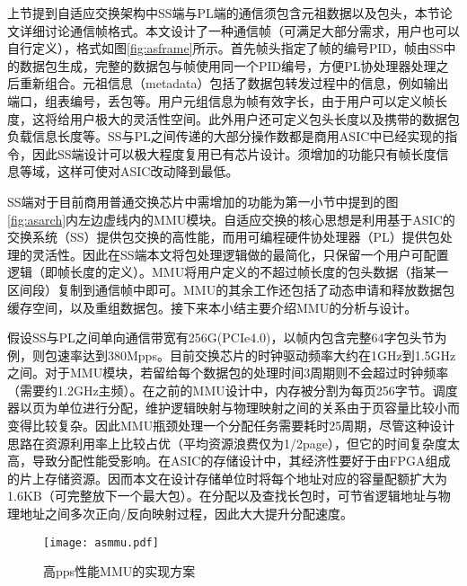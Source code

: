 上节提到自适应交换架构中SS端与PL端的通信须包含元祖数据以及包头，本节论文详细讨论通信帧格式。本文设计了一种通信帧（可满足大部分需求，用户也可以自行定义），格式如图\ref{fig:asframe}所示。首先帧头指定了帧的编号PID，帧由SS中的数据包生成，完整的数据包与帧使用同一个PID编号，方便PL协处理器处理之后重新组合。元祖信息（metadata）包括了数据包转发过程中的信息，例如输出端口，组表编号，丢包等。用户元组信息为帧有效字长，由于用户可以定义帧长度，这将给用户极大的灵活性空间。此外用户还可定义包头长度以及携带的数据包负载信息长度等。SS与PL之间传递的大部分操作数都是商用ASIC中已经实现的指令，因此SS端设计可以极大程度复用已有芯片设计。须增加的功能只有帧长度信息等域，这样可使对ASIC改动降到最低。

\label{chap442}

SS端对于目前商用普通交换芯片中需增加的功能为第一小节中提到的图 \ref{fig:asarch}内左边虚线内的MMU模块。自适应交换的核心思想是利用基于ASIC的交换系统（SS）提供包交换的高性能，而用可编程硬件协处理器（PL）提供包处理的灵活性。因此在SS端本文将包处理逻辑做的最简化，只保留一个用户可配置逻辑（即帧长度的定义）。MMU将用户定义的不超过帧长度的包头数据（指某一区间段）复制到通信帧中即可。MMU的其余工作还包括了动态申请和释放数据包缓存空间，以及重组数据包。接下来本小结主要介绍MMU的分析与设计。

假设SS与PL之间单向通信带宽有256G(PCIe4.0)，以帧内包含完整64字包头节为例，则包速率达到380Mpps。目前交换芯片的时钟驱动频率大约在1GHz到1.5GHz之间。对于MMU模块，若留给每个数据包的处理时间3周期则不会超过时钟频率（需要约1.2GHz主频）。在之前的MMU设计中，内存被分割为每页256字节。调度器以页为单位进行分配，维护逻辑映射与物理映射之间的关系由于页容量比较小而变得比较复杂。因此MMU瓶颈处理一个分配任务需要耗时25周期，尽管这种设计思路在资源利用率上比较占优（平均资源浪费仅为1/2page），但它的时间复杂度太高，导致分配性能受影响。在ASIC的存储设计中，其经济性要好于由FPGA组成的片上存储资源。因而本文在设计存储单位时将每个地址对应的容量配额扩大为1.6KB（可完整放下一个最大包）。在分配以及查找长包时，可节省逻辑地址与物理地址之间多次正向/反向映射过程，因此大大提升分配速度。

\begin{figure}[!ht]
	\centering 
	\vspace{-1.5mm} 
	\texttt{[image: asmmu.pdf]}
	\caption{高pps性能MMU的实现方案} \label{fig:asmmu}
\end{figure}

